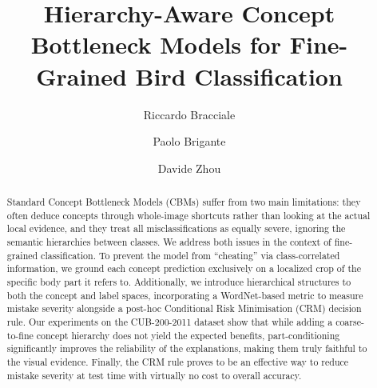 \documentclass[sigconf, nonacm]{acmart}
\begin{document}
\title{Hierarchy-Aware Concept Bottleneck Models for Fine-Grained Bird Classification}

\author{Riccardo Bracciale}

\author{Paolo Brigante}
\author{Davide Zhou}

\begin{abstract}
Standard Concept Bottleneck Models (CBMs) suffer from two main limitations:
they often deduce concepts through whole-image shortcuts rather than looking
at the actual local evidence, and they treat all misclassifications as
equally severe, ignoring the semantic hierarchies between classes. We
address both issues in the context of fine-grained classification. To
prevent the model from ``cheating'' via class-correlated information, we
ground each concept prediction exclusively on a localized crop of the
specific body part it refers to. Additionally, we introduce hierarchical
structures to both the concept and label spaces, incorporating a
WordNet-based metric to measure mistake severity alongside a post-hoc
Conditional Risk Minimisation (CRM) decision rule. Our experiments on the
CUB-200-2011 dataset show that while adding a coarse-to-fine concept
hierarchy does not yield the expected benefits, part-conditioning
significantly improves the reliability of the explanations, making them
truly faithful to the visual evidence. Finally, the CRM rule proves to be an
effective way to reduce mistake severity at test time with virtually no
cost to overall accuracy.
\end{abstract}

\maketitle
\fancyhead[LO]{}










\end{document}
